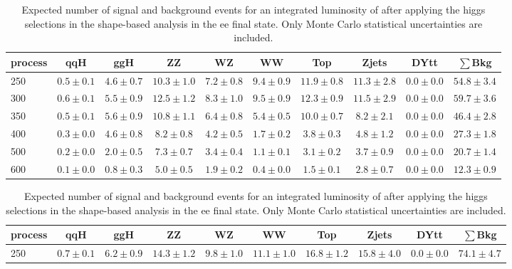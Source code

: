 \begin{table}
{\footnotesize
 \begin{center}
 \begin{tabular}{l | c c | c c c c c c c }
 \hline
 process & qqH & ggH & ZZ & WZ & WW & Top & Zjets & DYtt & $\sum$Bkg \\
 \hline
250 & $0.5\pm0.1$ & $4.6\pm0.7$ & $10.3\pm1.0$ & $7.2\pm0.8$ & $9.4\pm0.9$ & $11.9\pm0.8$ & $11.3\pm2.8$ & $0.0\pm0.0$ & $54.8\pm3.4$ \\ %
300 & $0.6\pm0.1$ & $5.5\pm0.9$ & $12.5\pm1.2$ & $8.3\pm1.0$ & $9.5\pm0.9$ & $12.3\pm0.9$ & $11.5\pm2.9$ & $0.0\pm0.0$ & $59.7\pm3.6$ \\%
350 & $0.5\pm0.1$ & $5.6\pm0.9$ & $10.8\pm1.1$ & $6.4\pm0.8$ & $5.4\pm0.5$ & $10.0\pm0.7$ & $8.2\pm2.1$ & $0.0\pm0.0$ & $46.4\pm2.8$ \\%
400 & $0.3\pm0.0$ & $4.6\pm0.8$ & $8.2\pm0.8$ & $4.2\pm0.5$ & $1.7\pm0.2$ & $3.8\pm0.3$ & $4.8\pm1.2$ & $0.0\pm0.0$ & $27.3\pm1.8$ \\ %
500 & $0.2\pm0.0$ & $2.0\pm0.5$ & $7.3\pm0.7$ & $3.4\pm0.4$ & $1.1\pm0.1$ & $3.1\pm0.2$ & $3.7\pm0.9$ & $0.0\pm0.0$ & $20.7\pm1.4$ \\%
600 & $0.1\pm0.0$ & $0.8\pm0.3$ & $5.0\pm0.5$ & $1.9\pm0.2$ & $0.4\pm0.0$ & $1.5\pm0.1$ & $2.8\pm0.7$ & $0.0\pm0.0$ & $12.3\pm0.9$ \\%
\hline
\end{tabular}
\end{center}
\label{tab:yield_shapebased_ee}
}
\caption{Expected number of signal and background events for an 
  integrated luminosity of \intlumi after applying the higgs selections in the shape-based analysis in the ee final state. 
  Only Monte Carlo statistical uncertainties are included. }
{\footnotesize
 \begin{center}
 \begin{tabular}{l | c c |  c c c c c c c }
 \hline
 process & qqH & ggH & ZZ & WZ & WW & Top & Zjets & DYtt & $\sum$Bkg \\
 \hline
250 & $0.7\pm0.1$ & $6.2\pm0.9$ & $14.3\pm1.2$ & $9.8\pm1.0$ & $11.1\pm1.0$ & $16.8\pm1.2$ & $15.8\pm4.0$ & $0.0\pm0.0$ & $74.1\pm4.7$ \\ %

\end{tabular}
\end{center}}
\end{table}
